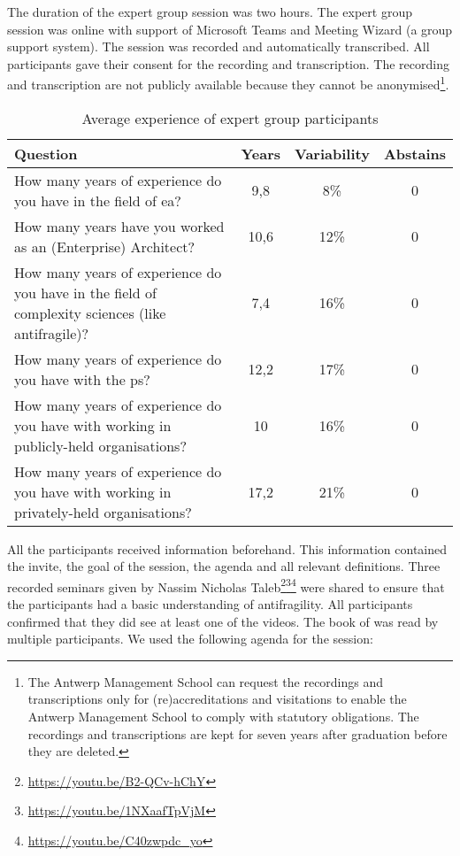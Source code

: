 The duration of the expert group session was two hours. The expert group session was online with support of Microsoft Teams and Meeting Wizard (a group support system). The session was recorded and automatically transcribed. All participants gave their consent for the recording and transcription. The recording and transcription are not publicly available because they cannot be anonymised\footnote{The Antwerp Management School can request the recordings and transcriptions only for (re)accreditations and visitations to enable the Antwerp Management School to comply with statutory obligations. The recordings and transcriptions are kept for seven years after graduation before they are deleted.}.
\begin{longtable}{@{}p{}ccc@{}}
	\toprule%
	\textbf{Question} & \textbf{Years} & \textbf{Variability} & \textbf{Abstains} \\
	\midrule%
	\endhead%
	\hline
	\endfoot%
	\caption[Average experience of expert group participants]{Average experience of expert group participants}
	\label{tab:experiencevalidationgroup}%
	\endlastfoot%
	How many years of experience do you have in the field of \gls{ea}? & 9,8 & 8\% & 0 \\%
	How many years have you worked as an (Enterprise) Architect? & 10,6 & 12\% & 0 \\%
	How many years of experience do you have in the field of complexity sciences (like \gls{antifragile})? & 7,4 & 16\% & 0 \\%
	How many years of experience do you have with the \gls{ps}? & 12,2 & 17\% & 0 \\%
	How many years of experience do you have with working in publicly-held organisations? & 10 & 16\% & 0 \\%
	How many years of experience do you have with working in privately-held organisations? & 17,2 & 21\% & 0 \\%
	\bottomrule%
\end{longtable}
All the participants received information beforehand. This information contained the invite, the goal of the session, the agenda and all relevant definitions. Three recorded seminars given by Nassim Nicholas Taleb\footnote{\url{https://youtu.be/B2-QCv-hChY}}\footnote{\url{https://youtu.be/1NXaafTpVjM}}\footnote{\url{https://youtu.be/C40zwpdc_yo}} were shared to ensure that the participants had a basic understanding of \gls{antifragility}. All participants confirmed that they did see at least one of the videos. The book of \textcite{Taleb2012} was read by multiple participants. We used the following agenda for the session:
